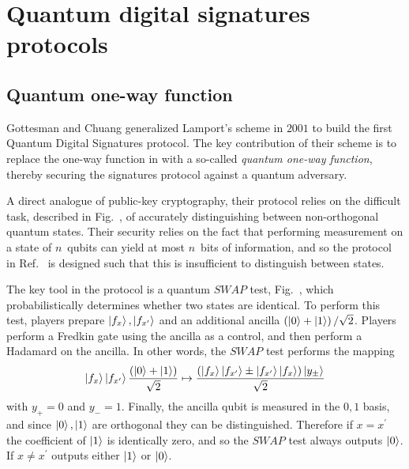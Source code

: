 \section{Quantum digital signatures protocols}



\subsection*{Quantum one-way function}
Gottesman and Chuang \cite{Gottesman2001} generalized Lamport's scheme  in $2001$ to build the first Quantum Digital Signatures protocol. The key contribution of their scheme is to replace the one-way function in  with a so-called \emph{quantum one-way function}, thereby securing the signatures protocol against a quantum adversary.


A direct analogue of public-key cryptography, their protocol relies on the difficult task, described in Fig.~, of accurately distinguishing between non-orthogonal quantum states. Their security relies on the fact that performing measurement on a state of $n$~qubits can yield at most $n$~bits of information, and so the protocol in Ref.~\cite{Gottesman2001} is designed such that this is insufficient to distinguish between states.

The key tool in the protocol is a quantum $SWAP$ test, Fig.~, which probabilistically determines whether two states are identical. To perform this test, players prepare $\ket{f_x}, \ket{f_{x^\prime}}$ and an additional ancilla $\left(\ket{0} + \ket{1}\right)/\sqrt{2}$. Players perform a Fredkin gate  using the ancilla as a control, and then perform a Hadamard  on the ancilla. In other words, the $SWAP$ test performs the mapping
\begin{equation}
\ket{f_x}\ket{f_{x^\prime}}\frac{\left(\ket{0} + \ket{1}\right)}{\sqrt{2}} \mapsto \frac{\left(\ket{f_x}\ket{f_{x^\prime}} \pm \ket{f_{x^\prime}}\ket{f_x}\right)\ket{y_{\pm}}}{\sqrt{2}}
\end{equation}
with $y_+=0$ and $y_-=1$. Finally, the ancilla qubit is measured in the $0, 1$ basis, and since $\ket{0}, \ket{1}$ are orthogonal they can be distinguished.  Therefore if $x = x^\prime$ the coefficient of $\ket{1}$ is identically zero, and so the $SWAP$ test always outputs $\ket{0}$. If $x \ne x^\prime$ outputs either $\ket{1}$ or $\ket{0}$. 

